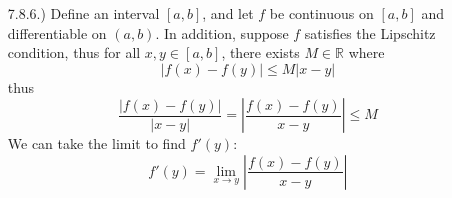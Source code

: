 \documentclass[11pt]{article}
\newcommand{\vertb}[1]{\left\vert#1\right\vert}      %
\newcommand{\R}{\mathbb{R}}
\newcommand{\lm}[1]{\displaystyle\lim_{#1}}
\begin{document}
\pagestyle{fancy}
\fancyhead{}

\normalsize

\begin{itemize}
    \item [7.8.6.)] Define an interval $[a,b]$, and let $f$ be continuous on $[a,b]$ and differentiable on $(a,b)$. In addition, suppose $f$ satisfies the Lipschitz condition, thus for all $x,y\in[a,b]$, there exists $M\in\R$ where
    \[\vertb{f(x)-f(y)}\leq M\vertb{x-y}\]
    thus
    \[\frac{\vertb{f(x)-f(y)}}{\vertb{x-y}}=\vertb{\frac{f(x)-f(y)}{x-y}}\leq M\]
    We can take the limit to find $f'(y)$:
    \[f'(y)=\lm{x\to y}\vertb{\frac{f(x)-f(y)}{x-y}}\]
\end{itemize}
\end{document}
